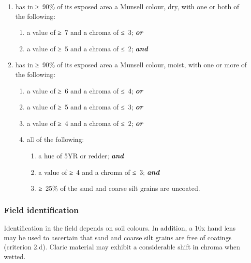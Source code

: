 \documentclass[
  letterpaper,
  DIV=11,
  numbers=noendperiod]{scrreprt}
\providecommand{\tightlist}{%
  \setlength{\itemsep}{0pt}\setlength{\parskip}{0pt}}\usepackage{longtable,booktabs,array}
\begin{document}
\begin{enumerate}
\def\labelenumi{\arabic{enumi}.}
\item
  has in ≥~90\% of its exposed area a Munsell colour, dry, with one or
  both of the following:

  \begin{enumerate}
  \def\labelenumii{\alph{enumii}.}
  \tightlist
  \item
    a value of ≥~7 and a chroma of ≤~3; \textbf{\emph{or}}
  \item
    a value of ≥~5 and a chroma of ≤~2; \textbf{\emph{and}}
  \end{enumerate}
\item
  has in ≥~90\% of its exposed area a Munsell colour, moist, with one or
  more of the following:

  \begin{enumerate}
  \def\labelenumii{\alph{enumii}.}
  \tightlist
  \item
    a value of ≥~6 and a chroma of ≤~4; \textbf{\emph{or}}
  \item
    a value of ≥~5 and a chroma of ≤~3; \textbf{\emph{or}}
  \item
    a value of ≥~4 and a chroma of ≤~2; \textbf{\emph{or}}
  \item
    all of the following:

    \begin{enumerate}
    \def\labelenumiii{\roman{enumiii}.}
    \tightlist
    \item
      a hue of 5YR or redder; \textbf{\emph{and}}
    \item
      a value of ≥~4 and a chroma of ≤~3; \textbf{\emph{and}}
    \item
      ≥~25\% of the sand and coarse silt grains are uncoated.
    \end{enumerate}
  \end{enumerate}
\end{enumerate}

\hypertarget{field-identification-41}{%
\subsubsection{Field identification}\label{field-identification-41}}

Identification in the field depends on soil colours. In addition, a 10x
hand lens may be used to ascertain that sand and coarse silt grains are
free of coatings (criterion 2.d). Claric material may exhibit a
considerable shift in chroma when wetted.
\end{document}
